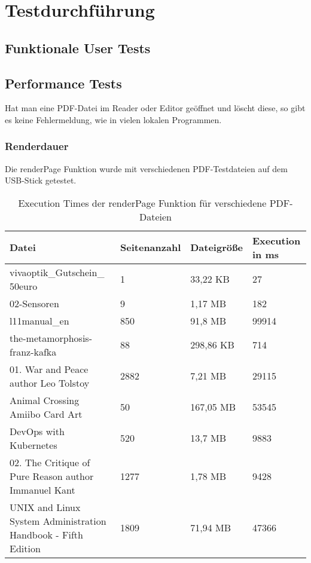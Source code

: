 \section{Testdurchführung}

\subsection{Funktionale User Tests}

\subsection{Performance Tests}
Hat man eine PDF-Datei im Reader oder Editor geöffnet und löscht diese, so gibt es keine Fehlermeldung, wie in vielen lokalen Programmen.
\subsubsection{Renderdauer}
Die renderPage Funktion wurde mit verschiedenen PDF-Testdateien auf dem USB-Stick getestet.

\begin{table}[ht]
	\centering
	\begin{tabular}{|p{4cm}|p{3cm}|p{3cm}|p{3cm}|}
		\hline
		\textbf{Datei}													& \textbf{Seitenanzahl} 	& \textbf{Dateigröße} 	& \textbf{Execution in ms}	\\ 
		\hline
		\parbox[t]{4cm}{vivaoptik\_Gutschein\_\\50euro}					& 1 						& 33,22 KB  			& 27						\\ 
		02-Sensoren														& 9 						& 1,17 MB  				& 182						\\ 
		l11manual\_en 													& 850 						& 91,8 MB  				& 99914						\\
		the-metamorphosis-franz-kafka 									& 88 						& 298,86 KB  			& 714						\\ 
		01. War and Peace author Leo Tolstoy 							& 2882 						& 7,21 MB  				& 29115						\\ 
		Animal Crossing Amiibo Card Art									& 50 						& 167,05 MB  			& 53545						\\  
		DevOps with Kubernetes											& 520 						& 13,7 MB  				& 9883						\\  
		02. The Critique of Pure Reason author Immanuel Kant			& 1277 						& 1,78 MB  				& 9428						\\  
		UNIX and Linux System Administration Handbook - Fifth Edition	& 1809						& 71,94 MB  			& 47366						\\ 
		\hline
	\end{tabular}
	\caption{Execution Times der renderPage Funktion für verschiedene PDF-Dateien}
	\label{table:render-dur}
\end{table}

